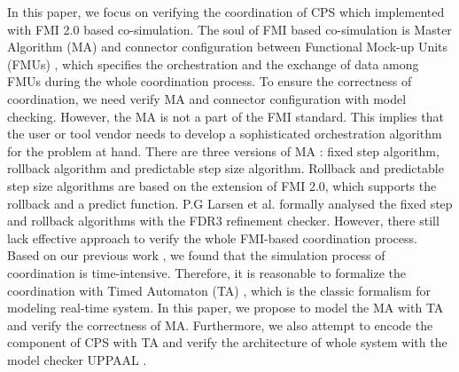 In this paper, we focus on verifying the coordination of CPS which implemented with FMI 2.0 \cite{Cremona2006Automatic} based co-simulation. The soul of FMI based co-simulation is Master Algorithm (MA) \cite{AckerDVM15} and connector configuration between Functional Mock-up Units (FMUs) \cite{Tripakis15}, which specifies the orchestration and the exchange of data among FMUs during the whole coordination process. To ensure the correctness of coordination, we need verify MA and connector configuration with model checking. However, the MA is not a part of the FMI standard. This implies that the user or tool vendor needs to develop a sophisticated orchestration algorithm for the problem at hand. 
There are three versions of MA \cite{BromanBGLMTW13}: fixed step algorithm, rollback algorithm and predictable step size algorithm. Rollback and predictable step size algorithms are based on the extension of FMI 2.0, which supports the rollback and a predict function. P.G Larsen et al. \cite{Larsen2016Integrated} formally analysed the fixed step and rollback algorithms with the FDR3 refinement checker. However, there still lack effective approach to verify the whole FMI-based coordination process. Based on our previous work \cite{LiuJWCD16}, we found that the simulation process of coordination is time-intensive. Therefore, it is reasonable to formalize the coordination with Timed Automaton (TA) \cite{BehrmannDLHPYH06}, which is the classic formalism for modeling real-time system. 
In this paper, we propose to model the MA with TA and verify the correctness of MA. Furthermore, we also attempt to encode the component of CPS with TA and verify the architecture of whole system with the model checker UPPAAL \cite{BehrmannDLHPYH06}. 

